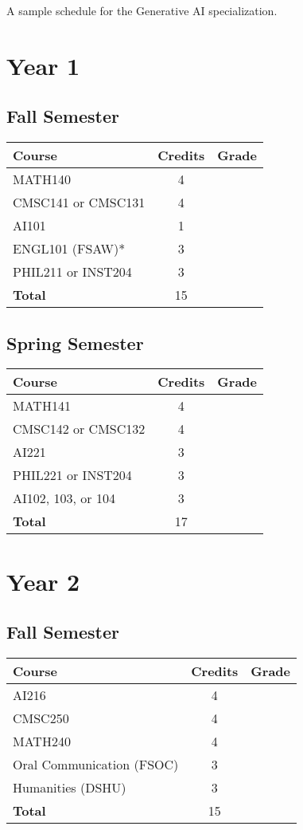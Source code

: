 
A sample schedule for the Generative AI specialization.

\section*{Year 1}
\subsection*{Fall Semester}
\begin{tabular}{|l|c|c|}
    \hline
    Course & Credits & Grade \\
    \hline
    MATH140 & 4 & \\
    CMSC141 or CMSC131 & 4 & \\
    AI101 & 1 & \\
    ENGL101 (FSAW)* & 3 & \\
    PHIL211 or INST204 & 3 & \\
    \hline
    \textbf{Total} & 15 & \\
    \hline
\end{tabular}

\subsection*{Spring Semester}
\begin{tabular}{|l|c|c|}
    \hline
    Course & Credits & Grade \\
    \hline
    MATH141 & 4 & \\
    CMSC142 or CMSC132 & 4 & \\
    AI221 & 3 & \\
    PHIL221 or INST204 & 3 & \\
    AI102, 103, or 104 & 3 & \\
    \hline
    \textbf{Total} & 17 & \\
    \hline
\end{tabular}

\section*{Year 2}
\subsection*{Fall Semester}
\begin{tabular}{|l|c|c|}
    \hline
    Course & Credits & Grade \\
    \hline
    AI216 & 4 & \\
    CMSC250 & 4 & \\
    MATH240 & 4 & \\
    Oral Communication (FSOC) & 3 & \\
    Humanities (DSHU) & 3 & \\
    \hline
    \textbf{Total} & 15 & \\
    \hline
\end{tabular}


